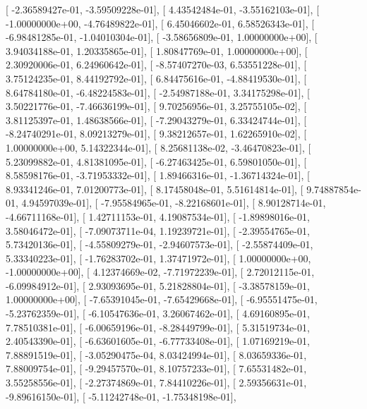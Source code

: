 \documentclass{article}
\begin{document}
       [ -2.36589427e-01,  -3.59509228e-01],
       [  4.43542484e-01,  -3.55162103e-01],
       [ -1.00000000e+00,  -4.76489822e-01],
       [  6.45046602e-01,   6.58526343e-01],
       [ -6.98481285e-01,  -1.04010304e-01],
       [ -3.58656809e-01,   1.00000000e+00],
       [  3.94034188e-01,   1.20335865e-01],
       [  1.80847769e-01,   1.00000000e+00],
       [  2.30920006e-01,   6.24960642e-01],
       [ -8.57407270e-03,   6.53551228e-01],
       [  3.75124235e-01,   8.44192792e-01],
       [  6.84475616e-01,  -4.88419530e-01],
       [  8.64784180e-01,  -6.48224583e-01],
       [ -2.54987188e-01,   3.34175298e-01],
       [  3.50221776e-01,  -7.46636199e-01],
       [  9.70256956e-01,   3.25755105e-02],
       [  3.81125397e-01,   1.48638566e-01],
       [ -7.29043279e-01,   6.33424744e-01],
       [ -8.24740291e-01,   8.09213279e-01],
       [  9.38212657e-01,   1.62265910e-02],
       [  1.00000000e+00,   5.14322344e-01],
       [  8.25681138e-02,  -3.46470823e-01],
       [  5.23099882e-01,   4.81381095e-01],
       [ -6.27463425e-01,   6.59801050e-01],
       [  8.58598176e-01,  -3.71953332e-01],
       [  1.89466316e-01,  -1.36714324e-01],
       [  8.93341246e-01,   7.01200773e-01],
       [  8.17458048e-01,   5.51614814e-01],
       [  9.74887854e-01,   4.94597039e-01],
       [ -7.95584965e-01,  -8.22168601e-01],
       [  8.90128714e-01,  -4.66711168e-01],
       [  1.42711153e-01,   4.19087534e-01],
       [ -1.89898016e-01,   3.58046472e-01],
       [ -7.09073711e-04,   1.19239721e-01],
       [ -2.39554765e-01,   5.73420136e-01],
       [ -4.55809279e-01,  -2.94607573e-01],
       [ -2.55874409e-01,   5.33340223e-01],
       [ -1.76283702e-01,   1.37471972e-01],
       [  1.00000000e+00,  -1.00000000e+00],
       [  4.12374669e-02,  -7.71972239e-01],
       [  2.72012115e-01,  -6.09984912e-01],
       [  2.93093695e-01,   5.21828804e-01],
       [ -3.38578159e-01,   1.00000000e+00],
       [ -7.65391045e-01,  -7.65429668e-01],
       [ -6.95551475e-01,  -5.23762359e-01],
       [ -6.10547636e-01,   3.26067462e-01],
       [  4.69160895e-01,   7.78510381e-01],
       [ -6.00659196e-01,  -8.28449799e-01],
       [  5.31519734e-01,   2.40543390e-01],
       [ -6.63601605e-01,  -6.77733408e-01],
       [  1.07169219e-01,   7.88891519e-01],
       [ -3.05290475e-04,   8.03424994e-01],
       [  8.03659336e-01,   7.88009754e-01],
       [ -9.29457570e-01,   8.10757233e-01],
       [  7.65531482e-01,   3.55258556e-01],
       [ -2.27374869e-01,   7.84410226e-01],
       [  2.59356631e-01,  -9.89616150e-01],
       [ -5.11242748e-01,  -1.75348198e-01],
\end{document}
